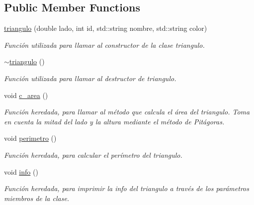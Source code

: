 \subsection*{Public Member Functions}
\begin{DoxyCompactItemize}
\item 
\hyperlink{classtriangulo_a0667fc13b900977472b1510da54848c5}{triangulo} (double lado, int id, std\+::string nombre, std\+::string color)
\begin{DoxyCompactList}\small\item\em Función utilizada para llamar al constructor de la clase triangulo. \end{DoxyCompactList}\item 
\mbox{\label{classtriangulo_a8af9d6bbfd02ed3a82bd30147958ac34}} 
\hyperlink{classtriangulo_a8af9d6bbfd02ed3a82bd30147958ac34}{$\sim$triangulo} ()
\begin{DoxyCompactList}\small\item\em Función utilizada para llamar al destructor de triangulo. \end{DoxyCompactList}\item 
\mbox{\label{classtriangulo_a811c2e134e17a643bb7dce811c361b01}} 
void \hyperlink{classtriangulo_a811c2e134e17a643bb7dce811c361b01}{c\+\_\+area} ()
\begin{DoxyCompactList}\small\item\em Función heredada, para llamar al método que calcula el área del triangulo. Toma en cuenta la mitad del lado y la altura mediante el método de Pitágoras. \end{DoxyCompactList}\item 
\mbox{\label{classtriangulo_ad6ab43c962e747474bc155ca795fc1d8}} 
void \hyperlink{classtriangulo_ad6ab43c962e747474bc155ca795fc1d8}{perimetro} ()
\begin{DoxyCompactList}\small\item\em Función heredada, para calcular el perímetro del triangulo. \end{DoxyCompactList}\item 
\mbox{\label{classtriangulo_a0c489c6445ab778d8e6f4918bcc62649}} 
void \hyperlink{classtriangulo_a0c489c6445ab778d8e6f4918bcc62649}{info} ()
\begin{DoxyCompactList}\small\item\em Función heredada, para imprimir la info del triangulo a través de los parámetros miembros de la clase. \end{DoxyCompactList}\item 

\end{DoxyCompactItemize}

